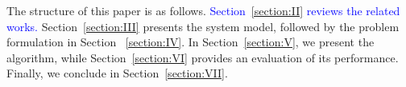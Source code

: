 \documentclass[10pt, journal,letterpaper]{IEEEtran}
\begin{document}
\begin{itemize}
	
	
	
	
	
\end{itemize}
The structure of this paper is as follows.  \textcolor{blue}{Section~\ref{section:II} reviews the related works.} Section~\ref{section:III} presents the system model, followed by the problem formulation in Section ~\ref{section:IV}. In Section~\ref{section:V}, we present the algorithm, while Section~\ref{section:VI} provides an evaluation of its performance. Finally, we conclude in Section~\ref{section:VII}. \color{blue}
\end{document}
